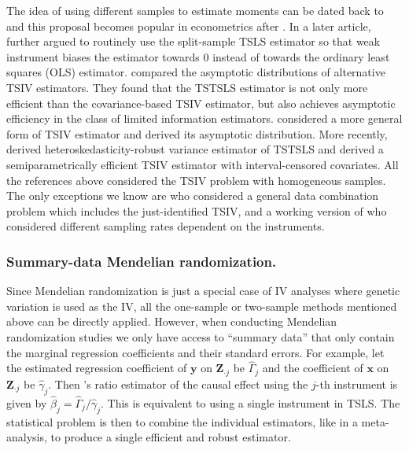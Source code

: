\documentclass[preprint]{imsart}
\begin{document}
The idea of using different samples to estimate moments can be dated
back to \citet{klevmarken1982missing} and this proposal becomes
popular in econometrics after \citet{angrist1992effect}. In a later
article, \citet{angrist1995split} further argued to routinely use the
split-sample TSLS estimator so that weak instrument biases the estimator
towards $0$ instead of towards the ordinary least squares (OLS)
estimator. \citet{inoue2010two} compared the asymptotic distributions
of alternative TSIV estimators. They found that the TSTSLS estimator
is not only  more efficient than the covariance-based TSIV estimator,
but also achieves asymptotic efficiency in the class of limited
information estimators. \citet{ridder2007econometrics} considered a
more general form of TSIV estimator and derived its asymptotic
distribution. More recently, \citet{pacini2016robust} derived
heteroskedasticity-robust variance estimator of TSTSLS and
\citet{pacini2018two} derived a semiparametrically efficient TSIV
estimator with interval-censored covariates. All the references above
considered the TSIV problem with homogeneous samples. The only
exceptions we know are \citet{graham2016efficient} who considered a
general data combination problem which includes the just-identified
TSIV, and a working version of \citet{inoue2010two} who considered
different sampling rates dependent on the instruments.

\subsubsection{Summary-data Mendelian randomization.}
\label{sec:summ-data-mend}

Since Mendelian randomization is just a special case of IV analyses
where genetic variation is used as the IV, all the one-sample or
two-sample methods mentioned above can be directly
applied. However, when conducting Mendelian randomization studies we
only have access to ``summary data'' that only contain the marginal
regression coefficients and their standard errors. For example, let
the estimated regression coefficient of $\bm y$ on $\bm Z_{\cdot j}$ be
$\hat{\Gamma}_j$ and the coefficient of $\bm x$ on $\bm Z_{\cdot j}$ be
$\hat{\gamma}_j$. Then \citet{wald1940fitting}'s ratio estimator of
the causal effect using the $j$-th instrument is given by
$\hat{\beta}_j = \hat{\Gamma}_j / \hat{\gamma}_j$. This is equivalent
to using a single instrument in TSLS. The statistical problem is then
to combine the individual estimators, like in a meta-analysis, to
produce a single efficient and robust estimator.
\end{document}
